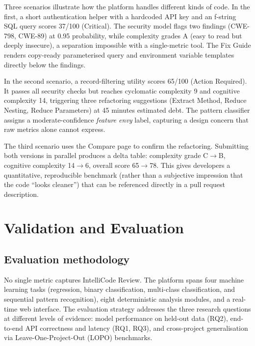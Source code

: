 \documentclass[12pt, oneside]{report}
\begin{document}
Three scenarios illustrate how the platform handles different kinds of code. In the first, a short authentication helper with a hardcoded API key and an f-string SQL query scores 37/100 (Critical). The security model flags two findings (CWE-798, CWE-89) at 0.95 probability, while complexity grades A (easy to read but deeply insecure), a separation impossible with a single-metric tool. The Fix Guide renders copy-ready parameterised query and environment variable templates directly below the findings.

In the second scenario, a record-filtering utility scores 65/100 (Action Required). It passes all security checks but reaches cyclomatic complexity 9 and cognitive complexity 14, triggering three refactoring suggestions (Extract Method, Reduce Nesting, Reduce Parameters) at 45 minutes estimated debt. The pattern classifier assigns a moderate-confidence \textit{feature envy} label, capturing a design concern that raw metrics alone cannot express.

The third scenario uses the Compare page to confirm the refactoring. Submitting both versions in parallel produces a delta table: complexity grade C$\to$B, cognitive complexity 14$\to$6, overall score 65$\to$78. This gives developers a quantitative, reproducible benchmark (rather than a subjective impression that the code ``looks cleaner'') that can be referenced directly in a pull request description.

\chapter{Validation and Evaluation}
\label{ch:eval}

\section{Evaluation methodology}
\label{sec:eval-methodology}

No single metric captures IntelliCode Review. The platform spans four machine learning
tasks (regression, binary classification, multi-class classification, and sequential
pattern recognition), eight deterministic analysis modules, and a real-time web interface.
The evaluation strategy addresses the three research questions at different levels of
evidence: model performance on held-out data (RQ2), end-to-end API correctness and
latency (RQ1, RQ3), and cross-project generalisation via Leave-One-Project-Out (LOPO)
benchmarks.
\end{document}
